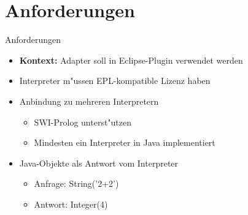 \documentclass[18pt]{beamer}
\begin{document}
\section{Anforderungen}
\begin{frame}{Anforderungen}
\begin{itemize}
\item \textbf{Kontext:} Adapter soll in Eclipse-Plugin verwendet werden
\vspace{0.3cm}
\item Interpreter m"ussen EPL-kompatible Lizenz haben
\vspace{0.3cm}
\item Anbindung zu mehreren Interpretern
\begin{itemize}
\item SWI-Prolog unterst"utzen
\item Mindesten ein Interpreter in Java implementiert
\end{itemize}
\vspace{0.3cm}
\item Java-Objekte als Antwort vom Interpreter
\begin{itemize}
\item Anfrage: String('2+2')
\item Antwort: Integer(4)
\end{itemize}
\end{itemize}
\end{frame}
\end{document}
